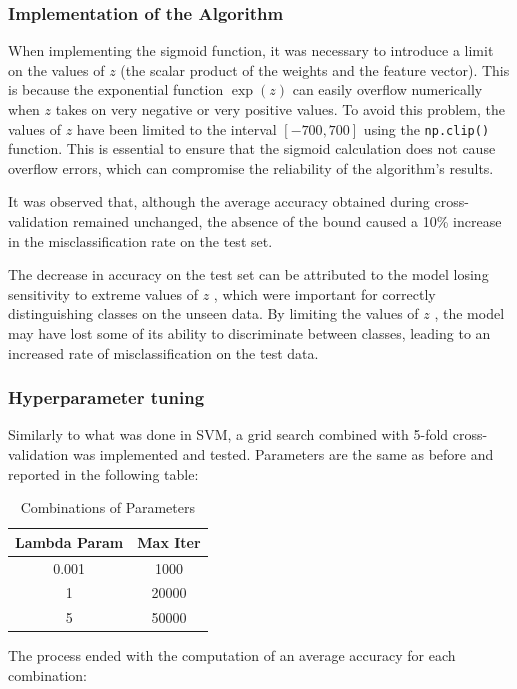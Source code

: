 \documentclass[a4paper, 10pt]{article}
\begin{document}
\subsubsection{Implementation of the Algorithm}

When implementing the sigmoid function, it was necessary to introduce a limit on the values of \(z\) (the scalar product of the weights and the feature vector). This is because the exponential function \(\exp(z)\) can easily overflow numerically when \(z\) takes on very negative or very positive values. To avoid this problem, the values of \(z\) have been limited to the interval \([-700, 700]\) using the \texttt{np.clip()} function. This is essential to ensure that the sigmoid calculation does not cause overflow errors, which can compromise the reliability of the algorithm's results.

It was observed that, although the average accuracy obtained during cross-validation remained unchanged, the absence of the bound caused a 10\% increase in the misclassification rate on the test set. 

The decrease in accuracy on the test set can be attributed to the model losing sensitivity to extreme values of \(z\) , which were important for correctly distinguishing classes on the unseen data. By limiting the values of \(z\) , the model may have lost some of its ability to discriminate between classes, leading to an increased rate of misclassification on the test data.

\subsubsection{Hyperparameter tuning}

Similarly to what was done in SVM, a grid search combined with 5-fold cross-validation was implemented and tested. Parameters are the same as before and reported in the following table:
\begin{table}[H]
\centering
\begin{tabular}{|c|c|}
\hline
\textbf{Lambda Param} & \textbf{Max Iter} \\ \hline
0.001 & 1000 \\ \hline
1 & 20000 \\ \hline
5 & 50000 \\ \hline
\end{tabular}
\caption{Combinations of Parameters}
\label{tab:param_combinations}
\end{table}

The process ended with the computation of an average accuracy for each combination:
\end{document}

